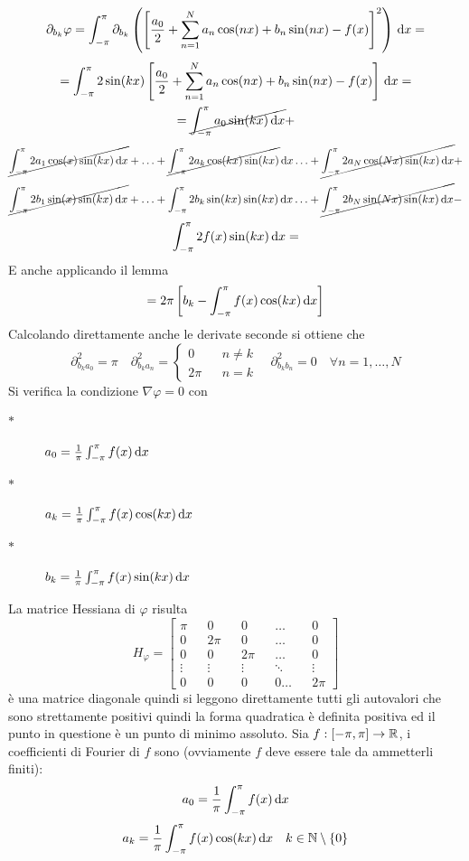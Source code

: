 \[\partial_{b_k}\varphi = \int_{-\pi}^{\pi}\partial_{b_k}\left(\left[\frac{a_0}{2}+\sum\limits_{n=1}^{N}a_{n}\cos(nx)+b_{n}\sin(nx)-f(x)\right]^2\right)\,\mathrm{d}{x}=\]
\[ = \int_{-\pi}^{\pi} 2\sin(kx) \left[\frac{a_0}{2}+\sum\limits_{n=1}^{N}a_{n}\cos(nx)+b_{n}\sin(nx)-f(x)\right]\,\mathrm{d}{x}=\]
\[ =  \cancel{\int_{-\pi}^{\pi} a_0\sin(kx)\,\mathrm{d}{x}} + \]
\[\cancel{\int_{-\pi}^{\pi} 2a_1\cos(x)\sin(kx)\,\mathrm{d}{x}} +
\ldots +
\cancel{\int_{-\pi}^{\pi} 2a_k \cos(kx)\sin(kx)}\,\mathrm{d}{x}
\ldots +
\cancel{\int_{-\pi}^{\pi} 2a_N \cos(Nx)\sin(kx)\,\mathrm{d}{x}} + \]
\[\cancel{\int_{-\pi}^{\pi} 2b_1\sin(x)\sin(kx)\,\mathrm{d}{x}} +
\ldots +
\int_{-\pi}^{\pi} 2b_k \sin(kx)\sin(kx)\,\mathrm{d}{x}
\ldots +
\cancel{\int_{-\pi}^{\pi} 2b_N \sin(Nx)\sin(kx)\,\mathrm{d}{x}} - \]
\[\int_{-\pi}^{\pi} 2f(x)\sin(kx)\,\mathrm{d}{x} = \]
E anche applicando il lemma
\[=2\pi\left[b_k-\int_{-\pi}^{\pi}f(x)\cos(kx)\,\mathrm{d}{x}\right]\]
Calcolando direttamente anche le derivate seconde si ottiene che
\[\partial^2_{b_ka_0}=\pi\quad\partial^2_{b_ka_n}=
\left\{\begin{matrix}
0&&n\ne k\\2\pi&&n=k
\end{matrix}\right.
\quad\partial^2_{b_kb_n}=0\quad\forall n=1,\dotsc,N\]
Si verifica la condizione $\nabla\varphi = 0$ con
\begin{description}
	\item[$\ast$] $a_0=\frac{1}{\pi}\int_{-\pi}^{\pi}f(x)\,\mathrm{d}{x}$
	\item[$\ast$] $a_k=\frac{1}{\pi}\int_{-\pi}^{\pi}f(x)\cos(kx)\,\mathrm{d}{x}$
	\item[$\ast$] $b_k=\frac{1}{\pi}\int_{-\pi}^{\pi}f(x)\sin(kx)\,\mathrm{d}{x}$
\end{description}
La matrice Hessiana di $\varphi$ risulta \[H_{\varphi}=\begin{bmatrix}
\pi&&0&&0&&\ldots&&0\\
0&&2\pi&&0&&\ldots&&0\\
0&&0&&2\pi&&\ldots&&0\\
\vdots&&\vdots&&\vdots&&\ddots&&\vdots\\
0&&0&&0&&0\ldots&&2\pi
\end{bmatrix}\]
è una matrice diagonale quindi si leggono direttamente tutti gli autovalori che sono strettamente positivi quindi la forma quadratica è definita positiva ed il punto in questione è un punto di minimo assoluto.
Sia $f: \left[-\pi,\pi\right] \to \mathbb{R}$, i coefficienti di Fourier di $f$ sono (ovviamente $f$ deve essere tale da ammetterli finiti):
\[a_0=\frac{1}{\pi}\int_{-\pi}^{\pi}f(x)\,\mathrm{d}{x}\]
\[a_k=\frac{1}{\pi}\int_{-\pi}^{\pi}f(x)\cos(kx)\,\mathrm{d}{x}\quad k\in\mathbb{N}\setminus{\left\{0\right\}}\]
